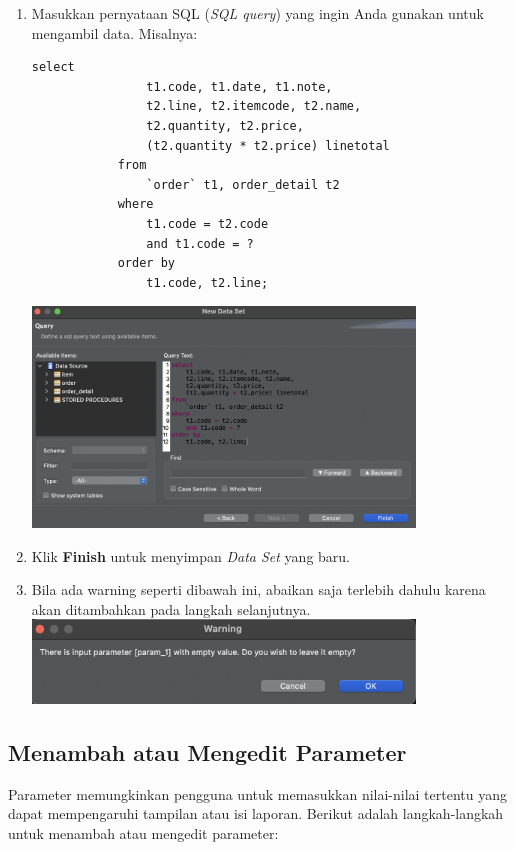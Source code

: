 \begin{enumerate}
	\item Masukkan pernyataan SQL (\textit{SQL query}) yang ingin Anda gunakan untuk mengambil data. Misalnya:
	\begin{lstlisting}[style=JavaStyle]
			select 
				t1.code, t1.date, t1.note, 
				t2.line, t2.itemcode, t2.name, 
				t2.quantity, t2.price, 
				(t2.quantity * t2.price) linetotal
			from 
				`order` t1, order_detail t2 
			where 
				t1.code = t2.code
				and t1.code = ?
			order by 
				t1.code, t2.line;
		\end{lstlisting} 
		\includegraphics[width=0.8\textwidth]{assets/pertemuan14/Data-Set/birt-query.png}
	
	\item Klik \textbf{Finish} untuk menyimpan \textit{Data Set} yang baru.
	
	\item Bila ada warning seperti dibawah ini, abaikan saja terlebih dahulu karena akan ditambahkan pada langkah selanjutnya. \\
	\includegraphics[width=0.8\textwidth]{assets/pertemuan14/Data-Set/birt-warning-after-data-set.png}
	
\end{enumerate}

\subsection{Menambah atau Mengedit Parameter}

Parameter memungkinkan pengguna untuk memasukkan nilai-nilai tertentu yang dapat mempengaruhi tampilan atau isi laporan. Berikut adalah langkah-langkah untuk menambah atau mengedit parameter:


